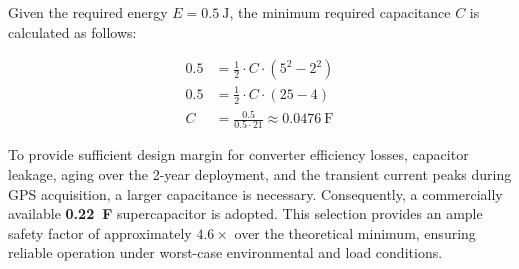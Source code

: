 \documentclass[paper=a4]{article}
\begin{document}
Given the required energy $E = \SI{0.5}{\joule}$, the minimum required capacitance $C$ is calculated as follows:

\begin{align*}
    0.5 &= \frac{1}{2} \cdot C \cdot \left(5^2 - 2^2\right) \\
    0.5 &= \frac{1}{2} \cdot C \cdot (25 - 4) \\
    C &= \frac{0.5}{0.5 \cdot 21} \approx \SI{0.0476}{\farad}
\end{align*}

To provide sufficient design margin for converter efficiency losses, capacitor leakage, aging over the 2-year deployment, and the transient current peaks during GPS acquisition, a larger capacitance is necessary. Consequently, a commercially available \textbf{\SI{0.22}{\farad}} supercapacitor is adopted. This selection provides an ample safety factor of approximately $4.6\times$ over the theoretical minimum, ensuring reliable operation under worst-case environmental and load conditions.
\end{document}
